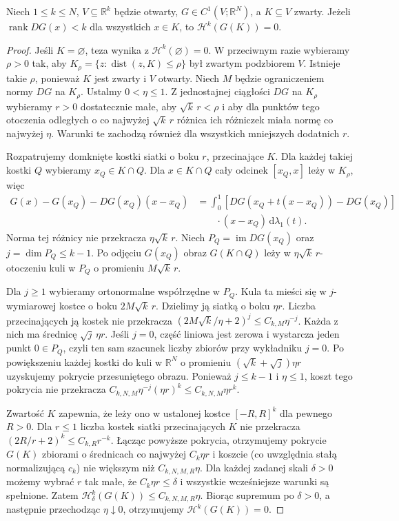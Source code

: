 \begin{lemat}
\label{lem:critical-area-null-28}
Niech $1\le k\le N$, $V\subseteq\mathbb R^k$ będzie
otwarty, $G\in C^1(V;\mathbb R^N)$, a
$K\subseteq V$ zwarty. Jeżeli
$\operatorname{rank}DG(x)<k$ dla wszystkich $x\in K$,
to $\mathcal H^k(G(K))=0$.
\end{lemat}
\begin{proof}
Jeśli $K=\varnothing$, teza wynika z $\mathcal H^k(\varnothing)=0$.
W przeciwnym razie wybieramy $\rho>0$ tak, aby
$K_\rho=\{z:\operatorname{dist}(z,K)\le\rho\}$ był
zwartym podzbiorem $V$. Istnieje takie $\rho$, ponieważ
$K$ jest zwarty i $V$ otwarty. Niech $M$ będzie
ograniczeniem normy $DG$ na $K_\rho$. Ustalmy
$0<\eta\le1$. Z jednostajnej ciągłości $DG$ na $K_\rho$
wybieramy $r>0$ dostatecznie małe, aby $\sqrt k\,r<\rho$
i aby dla punktów tego otoczenia odległych o co najwyżej
$\sqrt k\,r$ różnica ich różniczek miała normę co najwyżej
$\eta$. Warunki te zachodzą również dla wszystkich
mniejszych dodatnich $r$.

Rozpatrujemy domknięte kostki siatki o boku $r$,
przecinające $K$. Dla każdej takiej kostki $Q$
wybieramy $x_Q\in K\cap Q$. Dla $x\in K\cap Q$
cały odcinek $[x_Q,x]$ leży w $K_\rho$, więc
\begin{align*}
 G(x)-G(x_Q)-DG(x_Q)(x-x_Q)
 &=\int_0^1[DG(x_Q+t(x-x_Q))-DG(x_Q)]\\
 &\qquad\cdot(x-x_Q)\,\mathrm d\lambda_1(t).
\end{align*}
Norma tej różnicy nie przekracza $\eta\sqrt k\,r$.
Niech $P_Q=\operatorname{im}DG(x_Q)$ oraz
$j=\dim P_Q\le k-1$. Po odjęciu $G(x_Q)$
obraz $G(K\cap Q)$ leży w $\eta\sqrt k\,r$-otoczeniu
kuli w $P_Q$ o promieniu $M\sqrt k\,r$.

Dla $j\ge1$ wybieramy ortonormalne współrzędne w $P_Q$.
Kula ta mieści się w $j$-wymiarowej kostce o boku
$2M\sqrt k\,r$. Dzielimy ją siatką o boku $\eta r$.
Liczba przecinających ją kostek nie przekracza
$(2M\sqrt k/\eta+2)^j\le C_{k,M}\eta^{-j}$.
Każda z nich ma średnicę $\sqrt j\,\eta r$.
Jeśli $j=0$, część liniowa jest zerowa i wystarcza
jeden punkt $0\in P_Q$, czyli ten sam szacunek
liczby zbiorów przy wykładniku $j=0$.
Po powiększeniu każdej kostki do kuli w $\mathbb R^N$
o promieniu $(\sqrt k+\sqrt j)\eta r$ uzyskujemy
pokrycie przesuniętego obrazu. Ponieważ $j\le k-1$
i $\eta\le1$, koszt tego pokrycia nie przekracza
$C_{k,N,M}\eta^{-j}(\eta r)^k
\le C_{k,N,M}\eta r^k$.

Zwartość $K$ zapewnia, że leży ono w ustalonej
kostce $[-R,R]^k$ dla pewnego $R>0$. Dla $r\le1$
liczba kostek siatki przecinających $K$ nie przekracza
$(2R/r+2)^k\le C_{k,R}r^{-k}$. Łącząc powyższe
pokrycia, otrzymujemy pokrycie $G(K)$ zbiorami
o średnicach co najwyżej $C_k\eta r$ i koszcie
(co uwzględnia stałą normalizującą $c_k$)
nie większym niż $C_{k,N,M,R}\eta$.
Dla każdej zadanej skali $\delta>0$ możemy wybrać
$r$ tak małe, że $C_k\eta r\le\delta$ i wszystkie
wcześniejsze warunki są spełnione. Zatem
$\mathcal H^k_\delta(G(K))\le C_{k,N,M,R}\eta$.
Biorąc supremum po $\delta>0$, a następnie
przechodząc $\eta\downarrow0$, otrzymujemy
$\mathcal H^k(G(K))=0$.
\end{proof}

